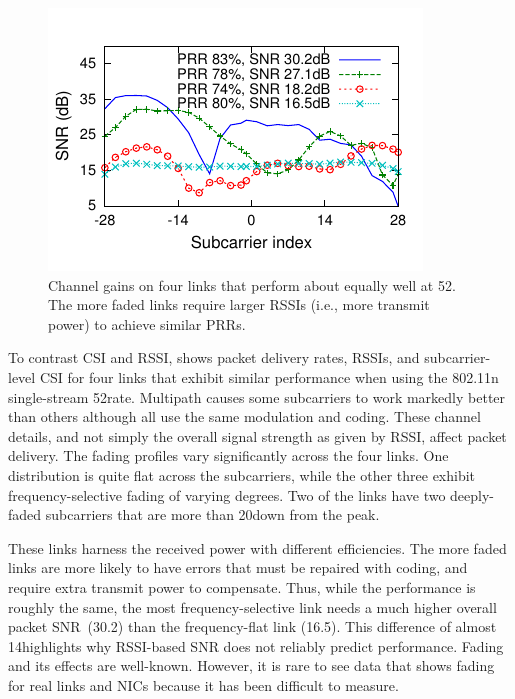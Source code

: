 \begin{figure}[t]
  \centering
  \includegraphics[width=\columnwidth,viewport=2 9 185 108,clip]{figures/esnr/embed_fsf-shape-two-links.pdf}
  \caption{Channel gains on four links that perform about equally well at 52\Mbps. The more faded links require larger RSSIs (i.e., more transmit power) to achieve similar PRRs.}
  \label{fig:example_fsf_shape}

\end{figure}

To contrast CSI and RSSI,  shows packet delivery rates, RSSIs, and subcarrier-level CSI for four links that exhibit similar performance when using the 802.11n single-stream 52\Mbps rate. Multipath causes some subcarriers to work markedly better than others although all use the same modulation and coding. These channel details, and not simply the overall signal strength as given by RSSI, affect packet delivery. The fading profiles vary significantly across the four links. One distribution is quite flat across the subcarriers, while the other three exhibit frequency-selective fading of varying degrees. Two of the links have two deeply-faded subcarriers that are more than 20\dB down from the peak.

These links harness the received power with different efficiencies.
The more faded links are more likely to have errors that must be repaired with coding, and require extra transmit power to compensate. Thus, while the performance is roughly the same, the most frequency-selective link needs a much higher overall packet SNR~(30.2\dB) than the frequency-flat link (16.5\dB). This difference of almost 14\dB highlights why RSSI-based SNR does not reliably predict performance. Fading and its effects are well-known. However, it is rare to see data that shows fading for real links and NICs because it has been difficult to measure.

